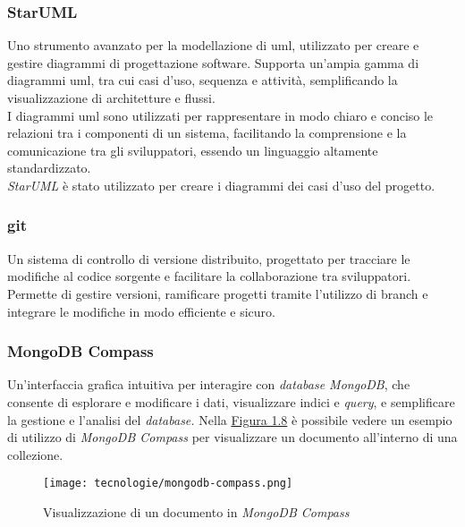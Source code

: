 \subsubsection{StarUML}

Uno strumento avanzato per la modellazione di \gls{uml}, utilizzato per creare e gestire diagrammi di progettazione software. Supporta un'ampia gamma di diagrammi \gls{uml}, tra cui casi d'uso, sequenza e attività, semplificando la visualizzazione di architetture e flussi.\\
I diagrammi \gls{uml} sono utilizzati per rappresentare in modo chiaro e conciso le relazioni tra i componenti di un sistema, facilitando la comprensione e la comunicazione tra gli sviluppatori, essendo un linguaggio altamente standardizzato.\\
\textit{StarUML} è stato utilizzato per creare i diagrammi dei casi d’uso del progetto.

\pagebreak
\subsubsection{git}

Un sistema di controllo di versione distribuito, progettato per tracciare le modifiche al codice sorgente e facilitare la collaborazione tra sviluppatori. \\
Permette di gestire versioni, ramificare progetti tramite l'utilizzo di \gls{branch} e integrare le modifiche in modo efficiente e sicuro. 

\subsubsection{MongoDB Compass}

Un'interfaccia grafica intuitiva per interagire con \textit{database MongoDB}, che consente di esplorare e modificare i dati, visualizzare indici e \textit{query},
e semplificare la gestione e l'analisi del \textit{database.}
Nella {\hyperref[fig:mongodb-compass]{Figura 1.8}} è possibile vedere un esempio di utilizzo di \textit{MongoDB Compass} per visualizzare un documento all'interno di una collezione.

\begin{figure}[H]
    \label{fig:mongodb-compass}
    \centering
    \texttt{[image: tecnologie/mongodb-compass.png]}
    \caption{Visualizzazione di un documento in \textit{MongoDB Compass}}
\end{figure}

